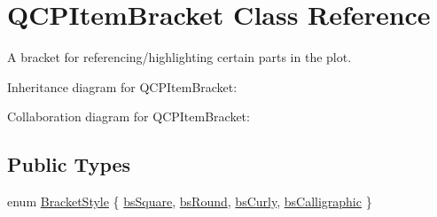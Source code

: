 \hypertarget{classQCPItemBracket}{}\section{Q\+C\+P\+Item\+Bracket Class Reference}
\label{classQCPItemBracket}


A bracket for referencing/highlighting certain parts in the plot.  




Inheritance diagram for Q\+C\+P\+Item\+Bracket\+:


Collaboration diagram for Q\+C\+P\+Item\+Bracket\+:
\subsection*{Public Types}
\begin{DoxyCompactItemize}
\item 
enum \hyperlink{classQCPItemBracket_a7ac3afd0b24a607054e7212047d59dbd}{Bracket\+Style} \{ \hyperlink{classQCPItemBracket_a7ac3afd0b24a607054e7212047d59dbda7f9df4a7359bfe3dac1dbe4ccf5d220c}{bs\+Square}, 
\hyperlink{classQCPItemBracket_a7ac3afd0b24a607054e7212047d59dbda394627b0830a26ee3e0a02ca67a9f918}{bs\+Round}, 
\hyperlink{classQCPItemBracket_a7ac3afd0b24a607054e7212047d59dbda5024ce4023c2d8de4221f1cd4816acd8}{bs\+Curly}, 
\hyperlink{classQCPItemBracket_a7ac3afd0b24a607054e7212047d59dbda8f29f5ef754e2dc9a9efdedb2face0f3}{bs\+Calligraphic}
 \}
\end{DoxyCompactItemize}
